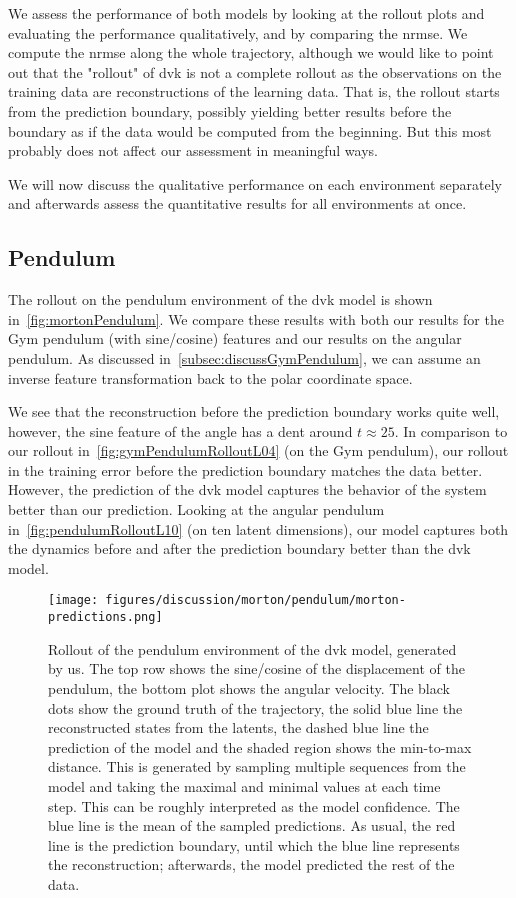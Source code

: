 	We assess the performance of both models by looking at the rollout plots and evaluating the performance qualitatively, and by comparing the \acrlong{nrmse}. We compute the \ac{nrmse} along the whole trajectory, although we would like to point out that the "rollout" of \ac{dvk} is not a complete rollout as the observations on the training data are reconstructions of the learning data. That is, the rollout starts from the prediction boundary, possibly yielding better results before the boundary as if the data would be computed from the beginning. But this most probably does not affect our assessment in meaningful ways.

	We will now discuss the qualitative performance on each environment separately and afterwards assess the quantitative results for all environments at once.

	\subsection{Pendulum}
		The rollout on the pendulum environment of the \ac{dvk} model is shown in~\autoref{fig:mortonPendulum}. We compare these results with both our results for the Gym pendulum (with sine/cosine) features and our results on the angular pendulum. As discussed in~\autoref{subsec:discussGymPendulum}, we can assume an inverse feature transformation back to the polar coordinate space.

		We see that the reconstruction before the prediction boundary works quite well, however, the sine feature of the angle has a dent around \( t \approx 25 \). In comparison to our rollout in~\autoref{fig:gymPendulumRolloutL04} (on the Gym pendulum), our rollout in the training error before the prediction boundary matches the data better. However, the prediction of the \ac{dvk} model captures the behavior of the system better than our prediction. Looking at the angular pendulum in~\autoref{fig:pendulumRolloutL10} (on ten latent dimensions), our model captures both the dynamics before and after the prediction boundary better than the \ac{dvk} model.

		\begin{figure}
			\centering
			\texttt{[image: figures/discussion/morton/pendulum/morton-predictions.png]}
			\caption[Rollout of the pendulum environment of the DVK model]{Rollout of the pendulum environment of the \ac{dvk} model, generated by us. The top row shows the sine/cosine of the displacement of the pendulum, the bottom plot shows the angular velocity. The black dots show the ground truth of the trajectory, the solid blue line the reconstructed states from the latents, the dashed blue line the prediction of the model and the shaded region shows the min-to-max distance. This is generated by sampling multiple sequences from the model and taking the maximal and minimal values at each time step. This can be roughly interpreted as the model confidence. The blue line is the mean of the sampled predictions. As usual, the red line is the prediction boundary, until which the blue line represents the reconstruction; afterwards, the model predicted the rest of the data.}
			\label{fig:mortonPendulum}
		\end{figure}

